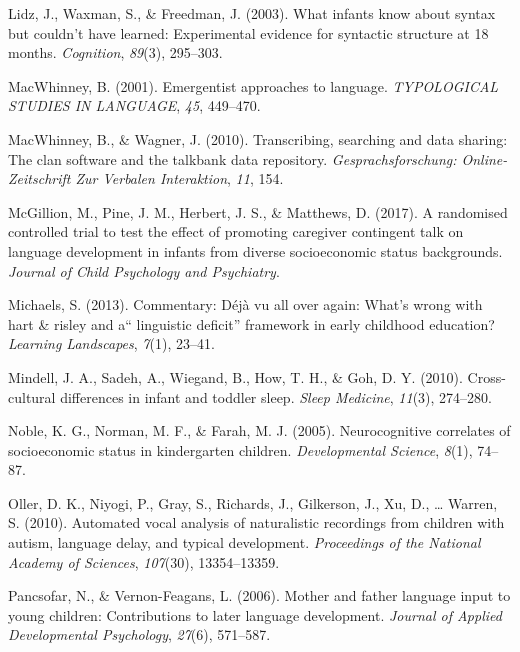 \documentclass[man]{apa6}
\theoremstyle{definition}
\theoremstyle{definition}
\theoremstyle{definition}
\theoremstyle{remark}
\begin{document}
\hypertarget{ref-lidz2003infants}{}
Lidz, J., Waxman, S., \& Freedman, J. (2003). What infants know about
syntax but couldn't have learned: Experimental evidence for syntactic
structure at 18 months. \emph{Cognition}, \emph{89}(3), 295--303.

\hypertarget{ref-macwhinney2001emergentist}{}
MacWhinney, B. (2001). Emergentist approaches to language.
\emph{TYPOLOGICAL STUDIES IN LANGUAGE}, \emph{45}, 449--470.

\hypertarget{ref-macwhinney2010transcribing}{}
MacWhinney, B., \& Wagner, J. (2010). Transcribing, searching and data
sharing: The clan software and the talkbank data repository.
\emph{Gesprachsforschung: Online-Zeitschrift Zur Verbalen Interaktion},
\emph{11}, 154.

\hypertarget{ref-mcgillion2017randomised}{}
McGillion, M., Pine, J. M., Herbert, J. S., \& Matthews, D. (2017). A
randomised controlled trial to test the effect of promoting caregiver
contingent talk on language development in infants from diverse
socioeconomic status backgrounds. \emph{Journal of Child Psychology and
Psychiatry}.

\hypertarget{ref-michaels2013commentary}{}
Michaels, S. (2013). Commentary: Déjà vu all over again: What's wrong
with hart \& risley and a`` linguistic deficit'' framework in early
childhood education? \emph{Learning Landscapes}, \emph{7}(1), 23--41.

\hypertarget{ref-mindell2010cross}{}
Mindell, J. A., Sadeh, A., Wiegand, B., How, T. H., \& Goh, D. Y.
(2010). Cross-cultural differences in infant and toddler sleep.
\emph{Sleep Medicine}, \emph{11}(3), 274--280.

\hypertarget{ref-noble2005neurocognitive}{}
Noble, K. G., Norman, M. F., \& Farah, M. J. (2005). Neurocognitive
correlates of socioeconomic status in kindergarten children.
\emph{Developmental Science}, \emph{8}(1), 74--87.

\hypertarget{ref-oller2010automated}{}
Oller, D. K., Niyogi, P., Gray, S., Richards, J., Gilkerson, J., Xu, D.,
\ldots{} Warren, S. (2010). Automated vocal analysis of naturalistic
recordings from children with autism, language delay, and typical
development. \emph{Proceedings of the National Academy of Sciences},
\emph{107}(30), 13354--13359.

\hypertarget{ref-pancsofar2006mother}{}
Pancsofar, N., \& Vernon-Feagans, L. (2006). Mother and father language
input to young children: Contributions to later language development.
\emph{Journal of Applied Developmental Psychology}, \emph{27}(6),
571--587.
\end{document}
